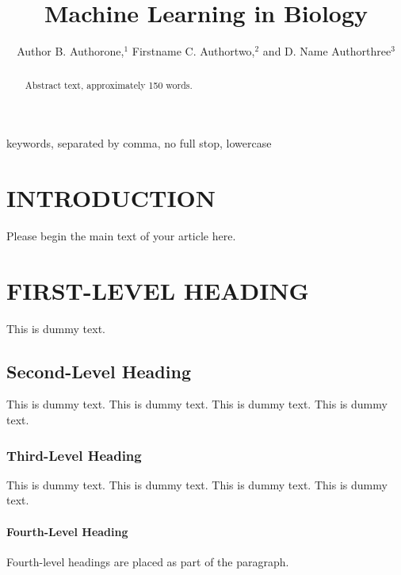 \documentclass{ar-1col-S2O}
\begin{document}

\title{Machine Learning in Biology}


\author{Author B. Authorone,$^1$ Firstname C. Authortwo,$^2$ and D. Name Authorthree$^3$
}

\begin{abstract}
Abstract text, approximately 150 words. 
\end{abstract}

\begin{keywords}
keywords, separated by comma, no full stop, lowercase
\end{keywords}
\maketitle

\tableofcontents


\section{INTRODUCTION}
Please begin the main text of your article here. 



\section{FIRST-LEVEL HEADING}
This is dummy text. 
\subsection{Second-Level Heading}
This is dummy text. This is dummy text. This is dummy text. This is dummy text.

\subsubsection{Third-Level Heading}
This is dummy text. This is dummy text. This is dummy text. This is dummy text. 

\paragraph{Fourth-Level Heading} Fourth-level headings are placed as part of the paragraph.
\end{document}
